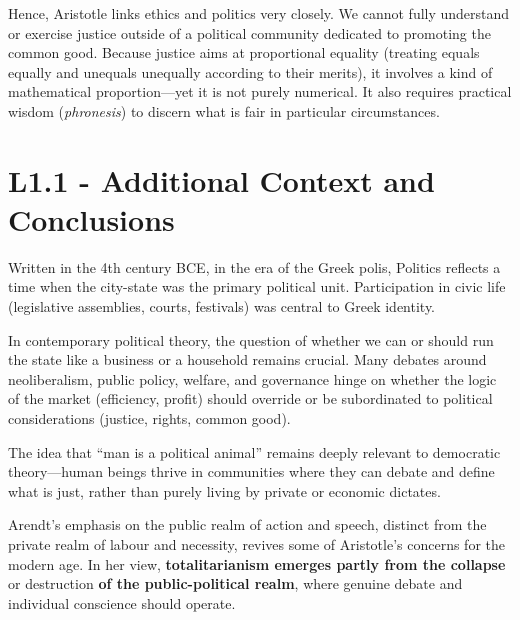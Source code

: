                     Hence, Aristotle links ethics and politics very closely. We cannot fully understand or exercise justice outside of a political community dedicated to promoting the common good. Because justice aims at proportional equality (treating equals equally and unequals unequally according to their merits), it involves a kind of mathematical proportion—yet it is not purely numerical. It also requires practical wisdom (\textit{phronesis}) to discern what is fair in particular circumstances.

        \section*{L1.1 - Additional Context and Conclusions}
                    
            \begin{remark}
                Written in the 4th century BCE, in the era of the Greek polis, Politics reflects a time when the city-state was the primary political unit. Participation in civic life (legislative assemblies, courts, festivals) was central to Greek identity.
            \end{remark}

            \begin{remark}
                In contemporary political theory, the question of whether we can or should run the state like a business or a household remains crucial. Many debates around neoliberalism, public policy, welfare, and governance hinge on whether the logic of the market (efficiency, profit) should override or be subordinated to political considerations (justice, rights, common good).
                
                The idea that “man is a political animal” remains deeply relevant to democratic theory—human beings thrive in communities where they can debate and define what is just, rather than purely living by private or economic dictates.
            \end{remark}

            \begin{remark}
                Arendt’s emphasis on the public realm of action and speech, distinct from the private realm of labour and necessity, revives some of Aristotle’s concerns for the modern age. In her view, \textbf{totalitarianism emerges partly from the collapse} or destruction \textbf{of the public-political realm}, where genuine debate and individual conscience should operate.
            \end{remark}

